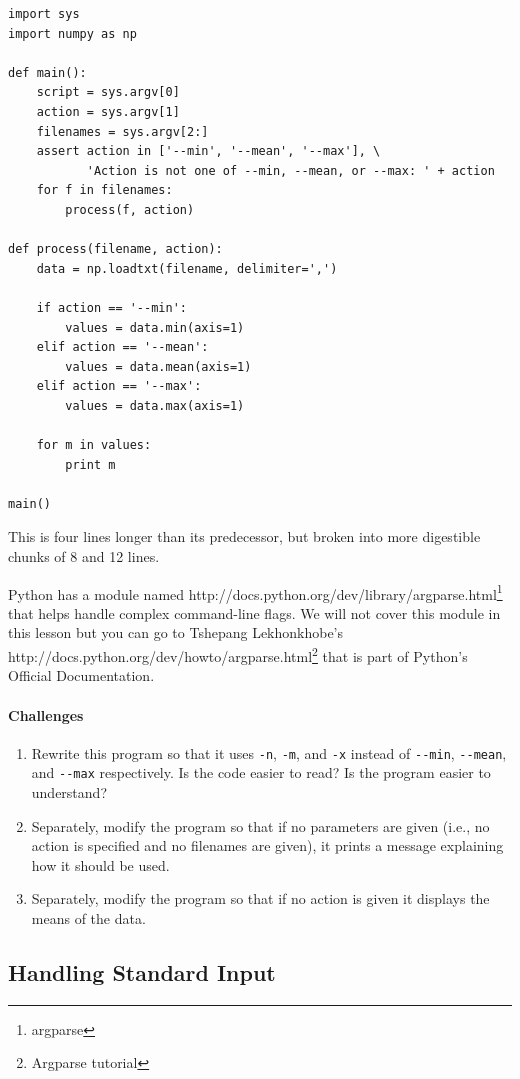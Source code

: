 \documentclass[]{book}
\newcommand{\urlfoot}[2]{{#1}\footnote{#2}}
\begin{document}
\begin{verbatim}
import sys
import numpy as np

def main():
    script = sys.argv[0]
    action = sys.argv[1]
    filenames = sys.argv[2:]
    assert action in ['--min', '--mean', '--max'], \
           'Action is not one of --min, --mean, or --max: ' + action
    for f in filenames:
        process(f, action)

def process(filename, action):
    data = np.loadtxt(filename, delimiter=',')

    if action == '--min':
        values = data.min(axis=1)
    elif action == '--mean':
        values = data.mean(axis=1)
    elif action == '--max':
        values = data.max(axis=1)

    for m in values:
        print m

main()
\end{verbatim}

This is four lines longer than its predecessor, but broken into more
digestible chunks of 8 and 12 lines.

Python has a module named
\urlfoot{http://docs.python.org/dev/library/argparse.html}{argparse} that
helps handle complex command-line flags. We will not cover this module
in this lesson but you can go to Tshepang Lekhonkhobe's
\urlfoot{http://docs.python.org/dev/howto/argparse.html}{Argparse tutorial}
that is part of Python's Official Documentation.

\mbox{}\paragraph{Challenges}

\begin{enumerate}
\item
  Rewrite this program so that it uses \texttt{-n}, \texttt{-m}, and
  \texttt{-x} instead of \texttt{-{}-min}, \texttt{-{}-mean}, and
  \texttt{-{}-max} respectively. Is the code easier to read? Is the
  program easier to understand?
\item
  Separately, modify the program so that if no parameters are given
  (i.e., no action is specified and no filenames are given), it prints a
  message explaining how it should be used.
\item
  Separately, modify the program so that if no action is given it
  displays the means of the data.
\end{enumerate}

\subsection{Handling Standard Input}
\end{document}

